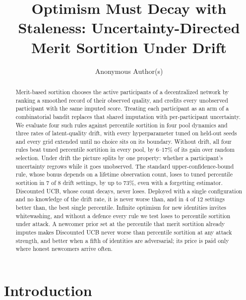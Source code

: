 \documentclass[sigconf,anonymous,review,nonacm]{acmart}
\begin{document}
\title{Optimism Must Decay with Staleness: Uncertainty-Directed Merit Sortition Under Drift}

\author{Anonymous Author(s)}

\begin{abstract}
Merit-based sortition chooses the active participants of a decentralized network by ranking
a smoothed record of their observed quality, and credits every unobserved participant with
the same imputed score. Treating each participant as an arm of a combinatorial bandit
replaces that shared imputation with per-participant uncertainty. We evaluate four such rules
against percentile sortition in four pool dynamics and three rates of latent-quality drift,
with every hyperparameter tuned on held-out seeds and every grid extended until no choice
sits on its boundary. Without drift, all four rules beat tuned percentile sortition in every
pool, by $6$--$17\%$ of its gain over random selection. Under drift the picture splits
by one property: whether a participant's uncertainty regrows while it goes unobserved. The
standard upper-confidence-bound rule, whose bonus depends on a lifetime observation count,
loses to tuned percentile sortition in $7$ of $8$ drift settings, by up to
$73\%$, even with a forgetting estimator. Discounted UCB, whose count decays, never
loses. Deployed with a single configuration and no knowledge of the drift rate, it is
never worse than, and in $4$ of $12$ settings better than, the best single percentile.
Infinite optimism for new identities invites whitewashing, and without a defence every
rule we test loses to percentile sortition under attack. A newcomer prior set at the
percentile that merit sortition already imputes makes Discounted UCB never worse than
percentile sortition at any attack strength, and better when a fifth of identities are
adversarial; its price is paid only where honest newcomers arrive often.
\end{abstract}


\maketitle

\section{Introduction}
\end{document}
